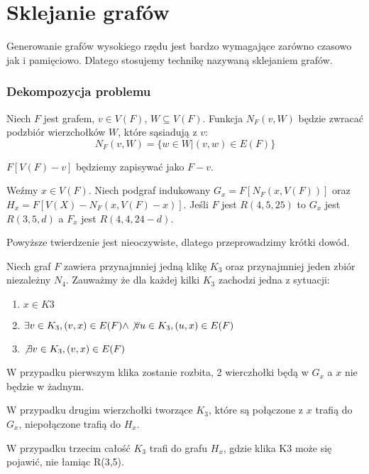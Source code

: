 \chapter{Sklejanie grafów}

Generowanie grafów wysokiego rzędu jest bardzo wymagające zarówno czasowo jak i pamięciowo. Dlatego stosujemy technikę nazywaną sklejaniem grafów. 

\subsection{Dekompozycja problemu}
\begin{definition}
  Niech $F$ jest grafem, $v \in V(F)$, $W \subseteq V(F)$. 
  Funkcja $N_F(v,W)$ będzie zwracać podzbiór wierzchołków $W$, które sąsiadują z $v$: 
  $$N_F(v,W) = \{w \in W | (v,w) \in E(F)\}$$ 
\end{definition}

\begin{definition}
  $F[V(F) - {v}]$ będziemy zapisywać jako $F - v$.
\end{definition}

\begin{theorem}
  Weźmy $x \in V(F)$. Niech podgraf indukowany $G_x = F[N_F(x,V(F))]$
  oraz $H_x = F[V(X) - N_F(x,V(F) - x)]$. Jeśli $F$ jest $R(4,5,25)$ to 
  $G_x$ jest $R(3,5,d)$ a $F_x$ jest $R(4,4,24-d)$.
\end{theorem}


Powyższe twierdzenie jest nieoczywiste, dlatego przeprowadzimy krótki dowód. 


  Niech graf $F$ zawiera przynajmniej jedną klikę $K_3$ oraz przynajmniej jeden zbiór niezależny $N_4$.
  Zauważmy że dla każdej kilki $K_3$ zachodzi jedna z sytuacji:
  \begin{enumerate}
    \item $x \in K3$
    \item $ \exists v \in K_3, (v, x) \in E(F) \land \not \forall u \in K_3, (u,x) \in E(F)$ 
    \item $\not \exists v \in K_3, (v, x) \in E(F)$
  \end{enumerate} 
  
  W przypadku pierwszym klika zostanie rozbita, 2 wierczhołki będą w $G_x$ a $x$ nie będzie w żadnym.
  
  W przypadku drugim wierzchołki tworzące $K_3$, które są połączone z $x$ trafią do $G_x$, niepołączone trafią do $H_x$.
  
  W przypadku trzecim całość $K_3$ trafi do grafu $H_x$, gdzie klika K3 może się pojawić, nie łamiąc R(3,5).

